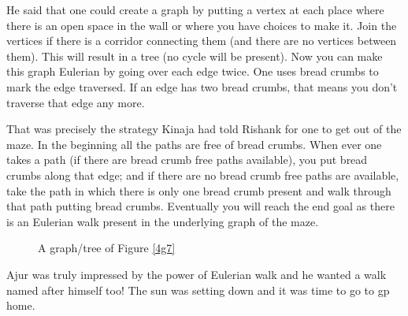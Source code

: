 He said that one could create a graph by putting a vertex at each place where there is an open space in the wall or where you have choices to make it. Join the vertices if there is a corridor connecting them (and there are no vertices between them). This will result in a tree (no cycle will be present). Now you can make this graph Eulerian by going over each edge twice. One uses bread crumbs to mark the edge traversed. If an edge has two bread crumbs, that means you don't traverse that edge any more.

That was precisely the strategy Kinaja had told Rishank for one to get out of the maze.  In the beginning all the paths are free of bread crumbs. When ever one takes a path (if there are bread crumb free paths available), you put bread crumbs along that edge; and if there are no bread crumb free paths are available, take the path in which there is only one bread crumb present and walk through that path putting bread crumbs. Eventually you will reach the end goal as there is an Eulerian walk present in the underlying graph of the maze.

\begin{figure}
\begin{center}
\caption{ A graph/tree of Figure \ref{4g7}}\label{4g8}
\end{center}
\end{figure}

Ajur was truly impressed by the power of Eulerian walk and he wanted a walk named after himself too! The sun was setting down and it was time to go to gp home.